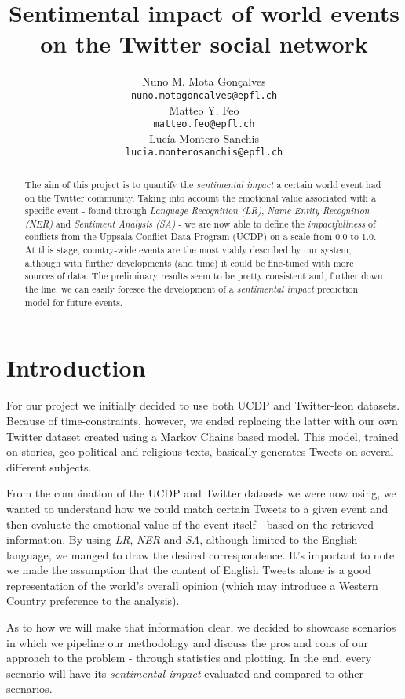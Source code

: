 \documentclass[11pt]{article}
\title{Sentimental impact of world events on the Twitter social network}
\author{Nuno M. Mota Gon\c{c}alves \\
	{\tt \small nuno.motagoncalves@epfl.ch} \\\And
	Matteo Y. Feo \\
	{\tt \small matteo.feo@epfl.ch} \\\And
	Luc\'{i}a Montero Sanchis\\
	{\tt \small lucia.monterosanchis@epfl.ch} \\}
\date{}
\begin{document}
	\maketitle
	\begin{abstract}
		The aim of this project is to quantify the \textit{sentimental impact} a certain
		world event had on the Twitter community. Taking into account the emotional
		value associated with a specific event - found through \textit{Language
			Recognition (LR)}, \textit{Name Entity Recognition (NER)} and \textit{Sentiment
			Analysis (SA)} - we are now able to define the \textit{impactfullness} of
		conflicts from the Uppsala Conflict Data Program (UCDP) on a scale from 0.0 to
		1.0. At this stage, country-wide events are the most viably described by our
		system, although with further developments (and time) it could be fine-tuned
		with more sources of data. The preliminary results seem to be pretty consistent
		and, further down the line, we can easily foresee the development of a
		\textit{sentimental impact} prediction model for future events.
	\end{abstract}
	
	\section{Introduction}
	
	For our project we initially decided to use both UCDP and Twitter-leon
	datasets. Because of time-constraints, however, we ended replacing the latter
	with our own Twitter dataset created using a Markov Chains based model. This
	model, trained on stories, geo-political and religious texts, basically
	generates Tweets on several different subjects.
	
	From the combination of the UCDP and Twitter datasets we were now using, we
	wanted to understand how we could match certain Tweets to a given event and then
	evaluate the emotional value of the event itself - based on the retrieved
	information. By using \textit{LR}, \textit{NER} and \textit{SA}, although
	limited to the English language, we manged to draw the desired correspondence.
	It's important to note we made the assumption that the content of English Tweets
	alone is a good representation of the world's overall opinion (which may
	introduce a Western Country preference to the analysis).
	
	As to how we will make that information clear, we decided to showcase scenarios
	in which we pipeline our methodology and discuss the pros and cons of our
	approach to the problem - through statistics and plotting. In the end, every
	scenario will have its \textit{sentimental impact} evaluated and compared to
	other scenarios.
	
\end{document}
